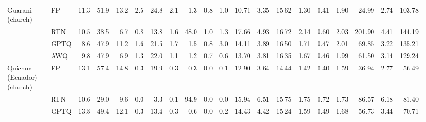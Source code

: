 \begin{landscape}
\begin{longtable}{llrrrrrrrrrrrrrrrrrr}
\midrule
Guarani (church) & FP & 11.3 & 51.9 & 13.2 & 2.5 & 24.8 & 2.1 & 1.3 & 0.8 & 1.0 & 10.71 & 3.35 & 15.62 & 1.30 & 0.41 & 1.90 & 24.99 & 2.74 & 103.78 \\
 & RTN & \cellcolor{loss!2}10.5 & \cellcolor{loss!28}38.5 & \cellcolor{loss!14}6.7 & \cellcolor{loss!6}0.8 & \cellcolor{loss!40}13.8 & \cellcolor{loss!2}1.6 & \cellcolor{loss!30}48.0 & \cellcolor{loss!0}1.0 & \cellcolor{loss!0}1.3 & \cellcolor{loss!60}17.66 & \cellcolor{loss!14}4.93 & \cellcolor{loss!9}16.72 & \cellcolor{loss!60}2.14 & \cellcolor{loss!14}0.60 & \cellcolor{loss!9}2.03 & \cellcolor{loss!53}201.90 & \cellcolor{loss!1}4.41 & \cellcolor{loss!12}144.19 \\
 & GPTQ & \cellcolor{loss!6}8.6 & \cellcolor{loss!8}47.9 & \cellcolor{loss!4}11.2 & \cellcolor{loss!3}1.6 & \cellcolor{loss!12}21.5 & \cellcolor{loss!1}1.7 & \cellcolor{loss!0}1.5 & 0.8 & \cellcolor{loss!1}3.0 & \cellcolor{loss!29}14.11 & \cellcolor{loss!5}3.89 & \cellcolor{loss!8}16.50 & \cellcolor{loss!30}1.71 & \cellcolor{loss!4}0.47 & \cellcolor{loss!8}2.01 & \cellcolor{loss!14}69.85 & \cellcolor{loss!0}3.22 & \cellcolor{loss!9}135.21 \\
 & AWQ & \cellcolor{loss!3}9.8 & \cellcolor{loss!8}47.9 & \cellcolor{loss!13}6.9 & \cellcolor{loss!4}1.3 & \cellcolor{loss!10}22.0 & \cellcolor{loss!4}1.1 & 1.2 & 0.7 & 0.6 & \cellcolor{loss!26}13.70 & \cellcolor{loss!4}3.81 & \cellcolor{loss!6}16.35 & \cellcolor{loss!26}1.67 & \cellcolor{loss!4}0.46 & \cellcolor{loss!6}1.99 & \cellcolor{loss!11}61.50 & \cellcolor{loss!0}3.14 & \cellcolor{loss!8}129.24 \\
\midrule
Quichua (Ecuador) (church) & FP & 13.1 & 57.4 & 14.8 & 0.3 & 19.9 & 0.3 & 0.3 & 0.0 & 0.1 & 12.90 & 3.64 & 14.44 & 1.42 & 0.40 & 1.59 & 36.94 & 2.77 & 56.49 \\
 & RTN & \cellcolor{loss!5}10.6 & \cellcolor{loss!60}29.0 & \cellcolor{loss!11}9.6 & \cellcolor{loss!1}0.0 & \cellcolor{loss!60}3.3 & \cellcolor{loss!1}0.1 & \cellcolor{loss!60}94.9 & 0.0 & 0.0 & \cellcolor{loss!26}15.94 & \cellcolor{loss!25}6.51 & \cellcolor{loss!11}15.75 & \cellcolor{loss!24}1.75 & \cellcolor{loss!23}0.72 & \cellcolor{loss!10}1.73 & \cellcolor{loss!15}86.57 & \cellcolor{loss!1}6.18 & \cellcolor{loss!8}81.40 \\
 & GPTQ & 13.8 & \cellcolor{loss!17}49.4 & \cellcolor{loss!6}12.1 & \cellcolor{loss!0}0.3 & \cellcolor{loss!23}13.4 & \cellcolor{loss!0}0.3 & \cellcolor{loss!0}0.6 & 0.0 & \cellcolor{loss!0}0.2 & \cellcolor{loss!13}14.43 & \cellcolor{loss!7}4.42 & \cellcolor{loss!7}15.24 & \cellcolor{loss!12}1.59 & \cellcolor{loss!6}0.49 & \cellcolor{loss!6}1.68 & \cellcolor{loss!6}56.73 & \cellcolor{loss!0}3.44 & \cellcolor{loss!4}70.71 \\

\end{longtable}
\end{landscape}
